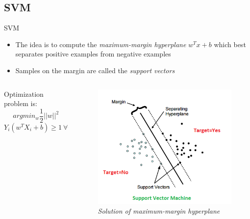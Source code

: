 \subsection{SVM}
\begin{frame}{SVM}
	\begin{itemize}\setlength\itemsep{1em}
		\item The idea is to compute the \textit{maximum-margin hyperplane} $w^Tx + b$ which best separates positive examples from negative examples
		\item Samples on the margin are called the \textit{support vectors}
	\end{itemize}
	\vspace{-20px}
	\begin{columns}
		\begin{column}{0.5\textwidth}\centering
			Optimization problem is:
			$$arg min_w \frac{1}{2} ||w||^2$$
			$$Y_i (w^T X_i + b) \geq 1 \ \forall i \in [1, n]$$
		\end{column}
		\begin{column}{0.5\textwidth}\centering
			\begin{figure}[htbp]
				\centering
				\includegraphics[scale = 0.40]{./images/optimal-hyperplane2.png}
				\caption{\textit{Solution of maximum-margin hyperplane}}
			\end{figure}
		\end{column}
	\end{columns}
	
	
	
\end{frame}


